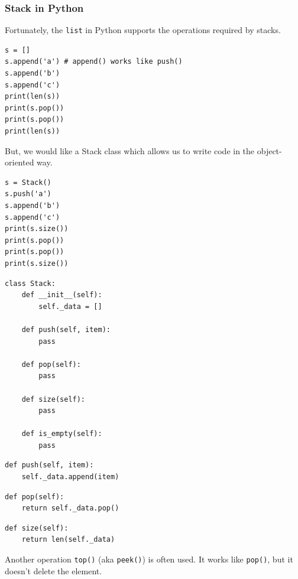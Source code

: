 \documentclass[aspectratio=169, 14pt]{beamer}
\begin{document}
\begin{frame}[fragile]
    \frametitle{Stack in Python}
    Fortunately, the \texttt{list} in Python supports the operations required by stacks.
\begin{verbatim}
s = []
s.append('a') # append() works like push()
s.append('b')
s.append('c')
print(len(s))
print(s.pop())
print(s.pop())
print(len(s))
\end{verbatim}     

\end{frame}

\begin{frame}[fragile]
But, we would like a \alert{Stack} class which allows us to write code in the object-oriented way. 
\begin{verbatim}
s = Stack()
s.push('a')
s.append('b')
s.append('c')
print(s.size())
print(s.pop())
print(s.pop())
print(s.size())
\end{verbatim}      

\end{frame}

\begin{frame}[fragile]

\begin{verbatim}
class Stack:
    def __init__(self):
        self._data = []

    def push(self, item):
        pass

    def pop(self):
        pass

    def size(self):
        pass

    def is_empty(self):
        pass
\end{verbatim}     

\end{frame}

\begin{frame}[fragile]
    \begin{verbatim}
def push(self, item):
    self._data.append(item)    
\end{verbatim}

\begin{verbatim}
def pop(self):
    return self._data.pop()   
\end{verbatim}

    \begin{verbatim}
def size(self):
    return len(self._data)    
    \end{verbatim}
\pause
Another operation \texttt{top()} (aka \texttt{peek()}) is often used. It works like \texttt{pop()}, but it doesn't delete the element.
\end{frame}
\end{document}
